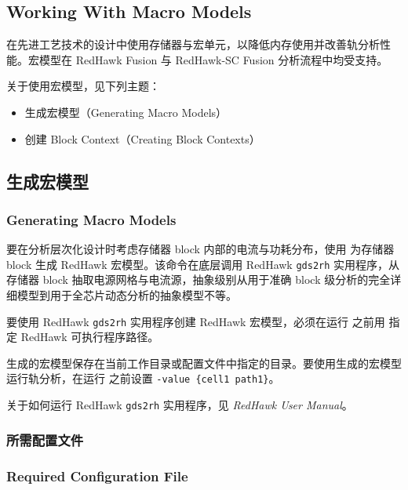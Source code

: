 \subsection*{Working With Macro Models}

在先进工艺技术的设计中使用存储器与宏单元，以降低内存使用并改善轨分析性能。宏模型在 RedHawk Fusion 与 RedHawk-SC Fusion 分析流程中均受支持。

关于使用宏模型，见下列主题：
\begin{itemize}
  \item 生成宏模型（Generating Macro Models）
  \item 创建 Block Context（Creating Block Contexts）
\end{itemize}

\subsection{生成宏模型}
\subsubsection*{Generating Macro Models}

要在分析层次化设计时考虑存储器 block 内部的电流与功耗分布，使用  为存储器 block 生成 RedHawk 宏模型。该命令在底层调用 RedHawk \texttt{gds2rh} 实用程序，从存储器 block 抽取电源网格与电流源，抽象级别从用于准确 block 级分析的完全详细模型到用于全芯片动态分析的抽象模型不等。

\begin{noteBox}
要使用 RedHawk \texttt{gds2rh} 实用程序创建 RedHawk 宏模型，必须在运行  之前用  指定 RedHawk 可执行程序路径。
\end{noteBox}

生成的宏模型保存在当前工作目录或配置文件中指定的目录。要使用生成的宏模型运行轨分析，在运行  之前设置  \texttt{-value \{cell1 path1\}}。

关于如何运行 RedHawk \texttt{gds2rh} 实用程序，见 \textit{RedHawk User Manual}。

\subsubsection{所需配置文件}
\subsubsection*{Required Configuration File}

